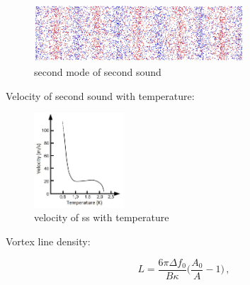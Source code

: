 \begin{figure}[h]
	\centering
	\includegraphics[width=0.7\textwidth]{graphics/theory/ss_2}
	\caption{second mode of second sound}
	\label{ss_2}
\end{figure}

Velocity of second sound with temperature:

\begin{figure}[h]
	\centering
	\includegraphics[width=0.3\textwidth]{graphics/theory/ss_velocity}
	\caption{velocity of ss with temperature}
	\label{ss_velocity}
\end{figure}

Vortex line density:

\begin{equation}
L = \frac{6\pi \Delta f_0}{B\kappa}\bigg( \frac{A_0}{A} - 1 \bigg)\,,
\label{L}
\end{equation}


\newpage

